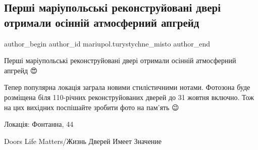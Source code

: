  
 
 
 
 

\subsection{Перші маріупольські реконструйовані двері отримали осінній атмосферний апгрейд}
\label{sec:29_10_2021.fb.mariupol.turystychne_misto.2.dveri_rekonstrukcia_upgrejd}

\ifcmt
 author_begin
   author_id mariupol.turystychne_misto
 author_end
\fi

Перші маріупольські реконструйовані двері отримали осінній атмосферний апгрейд 😍

Тепер популярна локація заграла новими стилістичними нотами. Фотозона буде
розміщена біля 110-річних реконструйованих дверей до 31 жовтня включно. Тож на
цих вихідних поспішайте зробити фото на пам'ять 😉

Локація: Фонтанна, 44

Doors Life Matters/Жизнь Дверей Имеет Значение
